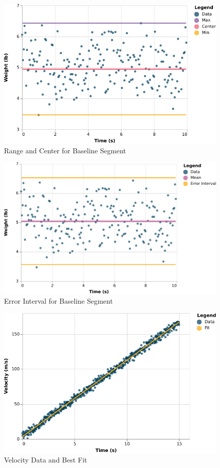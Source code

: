 \begin{figure}[ht]
    \centering
    \includegraphics{chart/00-intro/baseline-min-center-max.pdf}
    \caption{Range and Center for Baseline Segment}
    \label{figure:00.baseline.center}
\end{figure}
\begin{figure}[ht]
    \centering
    \includegraphics{chart/00-intro/baseline-error-interval.pdf}
    \caption{Error Interval for Baseline Segment}
    \label{figure:00.baseline.interval}
\end{figure}
\begin{figure}[ht]
    \centering
    \includegraphics{chart/00-intro/velocity-fit.pdf}
    \caption{Velocity Data and Best Fit}
    \label{figure:00.velocity.fit}
\end{figure}

